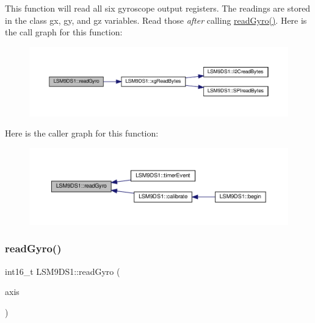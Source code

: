 This function will read all six gyroscope output registers. The readings are stored in the class\textquotesingle{} gx, gy, and gz variables. Read those {\itshape after} calling \hyperlink{classLSM9DS1_a56e9710cb538a4c7f7ab94c2ca256ce9}{read\+Gyro()}. Here is the call graph for this function\+:
\nopagebreak
\begin{figure}[H]
\begin{center}
\leavevmode
\includegraphics[width=350pt]{classLSM9DS1_a56e9710cb538a4c7f7ab94c2ca256ce9_cgraph}
\end{center}
\end{figure}
Here is the caller graph for this function\+:
\nopagebreak
\begin{figure}[H]
\begin{center}
\leavevmode
\includegraphics[width=350pt]{classLSM9DS1_a56e9710cb538a4c7f7ab94c2ca256ce9_icgraph}
\end{center}
\end{figure}
\mbox{\label{classLSM9DS1_adc1b37609a6c850328b16da4f911cefd}} 
\subsubsection{\texorpdfstring{read\+Gyro()}{readGyro()}\hspace{0.1cm}{\footnotesize\ttfamily [2/2]}}
{\footnotesize\ttfamily int16\+\_\+t L\+S\+M9\+D\+S1\+::read\+Gyro (\begin{DoxyParamCaption}\item[{lsm9ds1\+\_\+axis}]{axis }\end{DoxyParamCaption})}



